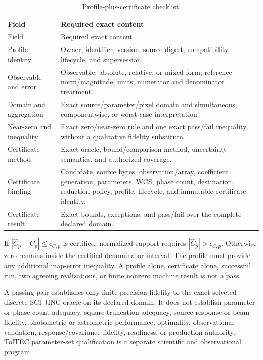 \documentclass[10pt]{article}
\begin{document}
\begin{longtable}{@{}>{\raggedright\arraybackslash}p{}
                        >{\raggedright\arraybackslash}p{}@{}}
\caption{Profile-plus-certificate checklist.}\label{tab:eng-profile}\\
\toprule
Field & Required exact content \\
\midrule
\endfirsthead
\toprule
Field & Required exact content \\
\midrule
\endhead
Profile identity & Owner, identifier, version, source digest, compatibility,
lifecycle, and supersession. \\
Observable and error & Observable; absolute, relative, or mixed form;
reference norm/magnitude; units; numerator and denominator treatment. \\
Domain and aggregation & Exact source/parameter/pixel domain and simultaneous,
componentwise, or worst-case interpretation. \\
Near-zero and inequality & Exact zero/near-zero rule and one exact pass/fail
inequality, without a qualitative fidelity substitute. \\
Certificate method & Exact oracle, bound/comparison method, uncertainty
semantics, and authorized coverage. \\
Certificate binding & Candidate, source bytes, observation/array, coefficient
generation, parameters, WCS, phase count, destination, reduction policy,
profile, lifecycle, and immutable certificate identity. \\
Certificate result & Exact bounds, exceptions, and pass/fail over the complete
declared domain. \\
\bottomrule
\end{longtable}

If $|\widehat C_p-C_p|\le\epsilon_{C,p}$ is certified, normalized support
requires $|\widehat C_p|>\epsilon_{C,p}$.  Otherwise zero remains inside the
certified denominator interval.  The profile must provide any additional
map-error inequality.  A profile alone, certificate alone, successful run,
two agreeing realizations, or finite nonzero machine result is not a pass.

A passing pair establishes only finite-precision fidelity to the exact
selected discrete SCI-JINC oracle on its declared domain.  It does not
establish parameter or phase-count adequacy, square-truncation adequacy,
source-response or beam fidelity, photometric or astrometric performance,
optimality, observational validation, response/covariance fidelity,
readiness, or production authority.  TolTEC parameter-set qualification is a
separate scientific and observational program.
\end{document}
